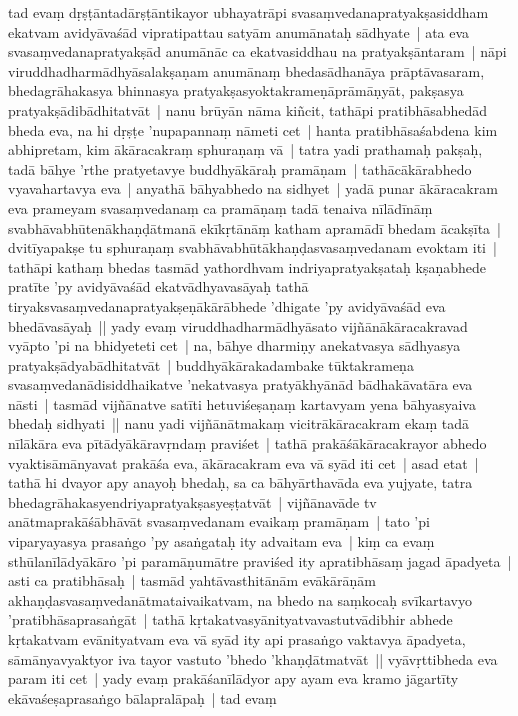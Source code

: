 \documentclass[article,12pt,a4paper]{memoir}%
\newcounter{parCount}
\begin{document}
	  \pstart \leavevmode%
	\label{thakur75-143.1}tad evaṃ dṛṣṭāntadārṣṭāntikayor ubhayatrāpi svasaṃvedanapratyakṣasiddham ekatvam avidyāvaśād vipratipattau satyām anumānataḥ sādhyate | ata eva svasaṃvedanapratyakṣād anumānāc ca ekatvasiddhau na pratyakṣāntaram | nāpi viruddhadharmādhyāsalakṣaṇam anumānaṃ bhedasādhanāya prāptāvasaram, bhedagrāhakasya bhinnasya pratyakṣasyoktakrameṇāprāmāṇyāt, pakṣasya pratyakṣādibādhitatvāt | \label{thakur75-143.6} nanu brūyān nāma kiñcit, tathāpi pratibhāsabhedād bheda eva, na hi dṛṣṭe 'nupapannaṃ nāmeti cet | hanta pratibhāsaśabdena kim abhipretam, kim ākāracakraṃ sphuraṇaṃ vā | tatra yadi prathamaḥ pakṣaḥ, tadā bāhye 'rthe pratyetavye buddhyākāraḥ pramāṇam | tathācākārabhedo vyavahartavya eva | anyathā bāhyabhedo na sidhyet | yadā punar ākāracakram eva prameyam svasaṃvedanaṃ ca pramāṇaṃ tadā tenaiva nīlādīnāṃ svabhāvabhūtenākhaṇḍātmanā ekīkṛtānāṃ katham apramādī bhedam ācakṣīta | \label{thakur75-143.12} dvitīyapakṣe tu sphuraṇaṃ svabhāvabhūtākhaṇḍasvasaṃvedanam evoktam iti | tathāpi kathaṃ bhedas tasmād yathordhvam indriyapratyakṣataḥ kṣaṇabhede pratīte 'py avidyāvaśād ekatvādhyavasāyaḥ tathā tiryaksvasaṃvedanapratyakṣeṇākārābhede 'dhigate 'py avidyāvaśād eva bhedāvasāyaḥ || \label{thakur75-143.15} yady evaṃ viruddhadharmādhyāsato vijñānākāracakravad vyāpto 'pi na bhidyeteti cet | na, bāhye dharmiṇy anekatvasya sādhyasya pratyakṣādyabādhitatvāt | buddhyākārakadambake tūktakrameṇa svasaṃvedanādisiddhaikatve 'nekatvasya pratyākhyānād bādhakāvatāra eva nāsti | tasmād vijñānatve satīti hetuviśeṣaṇaṃ kartavyam yena bāhyasyaiva bhedaḥ sidhyati || \label{thakur75-143.20} nanu yadi vijñānātmakaṃ vicitrākāracakram ekaṃ tadā nīlākāra eva pītādyākāravṛndaṃ praviśet | tathā prakāśākāracakrayor abhedo vyaktisāmānyavat prakāśa eva, ākāracakram eva vā syād iti cet | asad etat | tathā hi dvayor apy anayoḥ  bhedaḥ, sa ca bāhyārthavāda eva yujyate, tatra bhedagrāhakasyendriyapratyakṣasyeṣṭatvāt | vijñānavāde tv anātmaprakāśābhāvāt svasaṃvedanam evaikaṃ pramāṇam | tato 'pi viparyayasya  prasaṅgo 'py asaṅgataḥ ity advaitam eva | \label{thakur75-143.26} kiṃ ca evaṃ sthūlanīlādyākāro 'pi paramāṇumātre praviśed ity apratibhāsaṃ jagad āpadyeta | asti ca pratibhāsaḥ | tasmād yahtāvasthitānām evākārāṇām akhaṇḍasvasaṃvedanātmataivaikatvam, na bhedo na saṃkocaḥ svīkartavyo 'pratibhāsaprasaṅgāt | tathā kṛtakatvasyānityatvavastutvādibhir abhede kṛtakatvam evānityatvam eva vā syād ity api prasaṅgo vaktavya āpadyeta, sāmānyavyaktyor iva tayor vastuto 'bhedo 'khaṇḍātmatvāt || \label{thakur75-143.31} vyāvṛttibheda eva param iti cet | yady evaṃ prakāśanīlādyor apy ayam eva kramo jāgartīty ekāvaśeṣaprasaṅgo bālapralāpaḥ | tad evaṃ
	{}
	\pend%
      
\end{document}

